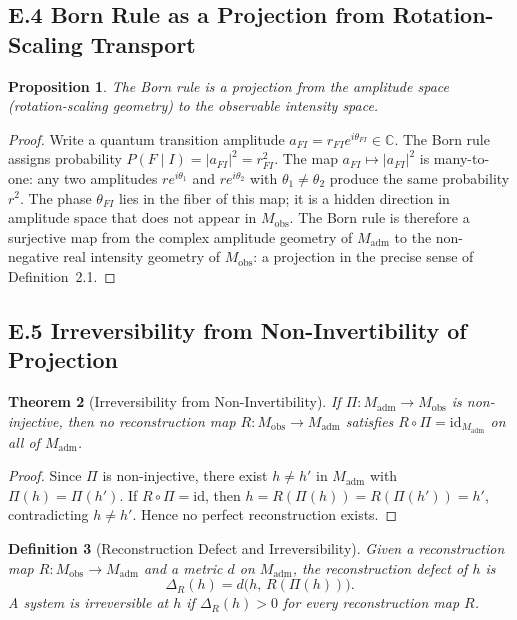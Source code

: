\documentclass[12pt,a4paper]{article}
\newtheorem{theorem}{Theorem}[section]
\newtheorem{proposition}[theorem]{Proposition}
\newtheorem{definition}[theorem]{Definition}
\theoremstyle{remark}
\begin{document}
\subsection*{E.4 Born Rule as a Projection from Rotation-Scaling Transport}

\begin{proposition}
The Born rule is a projection from the amplitude space (rotation-scaling
geometry) to the observable intensity space.
\end{proposition}

\begin{proof}
Write a quantum transition amplitude $a_{FI} = r_{FI}e^{i\theta_{FI}} \in \mathbb{C}$.
The Born rule assigns probability $P(F \mid I) = |a_{FI}|^2 = r_{FI}^2$.
The map $a_{FI} \mapsto |a_{FI}|^2$ is many-to-one: any two amplitudes
$re^{i\theta_1}$ and $re^{i\theta_2}$ with $\theta_1 \neq \theta_2$ produce
the same probability $r^2$. The phase $\theta_{FI}$ lies in the fiber of
this map; it is a hidden direction in amplitude space that does not appear
in $M_{\mathrm{obs}}$. The Born rule is therefore a surjective map from the
complex amplitude geometry of $M_{\mathrm{adm}}$ to the non-negative real
intensity geometry of $M_{\mathrm{obs}}$: a projection in the precise sense
of Definition~2.1.
\end{proof}

\subsection*{E.5 Irreversibility from Non-Invertibility of Projection}

\begin{theorem}[Irreversibility from Non-Invertibility]
If $\Pi : M_{\mathrm{adm}} \to M_{\mathrm{obs}}$ is non-injective, then
no reconstruction map $R : M_{\mathrm{obs}} \to M_{\mathrm{adm}}$ satisfies
$R \circ \Pi = \mathrm{id}_{M_{\mathrm{adm}}}$ on all of $M_{\mathrm{adm}}$.
\end{theorem}

\begin{proof}
Since $\Pi$ is non-injective, there exist $h \neq h'$ in $M_{\mathrm{adm}}$
with $\Pi(h) = \Pi(h')$. If $R \circ \Pi = \mathrm{id}$, then
$h = R(\Pi(h)) = R(\Pi(h')) = h'$, contradicting $h \neq h'$. Hence no
perfect reconstruction exists.
\end{proof}

\begin{definition}[Reconstruction Defect and Irreversibility]
Given a reconstruction map $R : M_{\mathrm{obs}} \to M_{\mathrm{adm}}$
and a metric $d$ on $M_{\mathrm{adm}}$, the \emph{reconstruction defect}
of $h$ is
\begin{equation}
  \Delta_R(h) = d\!\bigl(h,\, R(\Pi(h))\bigr).
\end{equation}
A system is \emph{irreversible at $h$} if $\Delta_R(h) > 0$ for every
reconstruction map $R$.
\end{definition}
\end{document}
